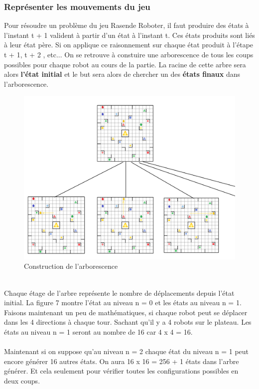 \documentclass{article}
\begin{document}
\subsubsection{Représenter les mouvements du jeu}
Pour résoudre un problème du jeu Rasende Roboter, il faut produire des états à l'instant t + 1 valident à partir d'un état à l'instant t. Ces états produits sont liés à leur état père. Si on applique ce raisonnement sur chaque état produit à l'étape t + 1, t + 2 , etc... On se retrouve à constuire une arborescence de tous les coups possibles pour chaque robot au cours de la partie. La racine de cette arbre sera alors \textbf{l'état initial} et le but sera alors de chercher un des \textbf{états finaux} dans l'arborescence.
\begin{figure}[htbp]
  \centering  
  \includegraphics[width=1\textwidth]{arbre.png}  
  \caption{Construction de l'arborescence} 
  \label{fig:Arborescence}  
\end{figure}\\
Chaque étage de l'arbre représente le nombre de déplacements depuis l'état initial. La figure 7 montre l'état au niveau n = 0 et les états au niveau n = 1. Faisons maintenant un peu de mathématiques, si chaque robot peut se déplacer dans les 4 directions à chaque tour. Sachant qu'il y a 4 robots sur le plateau. Les états au niveau n = 1 seront au nombre de 16 car 4 x 4 = 16.\\\\
Maintenant si on suppose qu'au niveau n = 2 chaque état du niveau n = 1 peut encore générer 16 autres états. On aura 16 x 16 = 256 + 1 états dans l'arbre générer. Et cela seulement pour vérifier toutes les configurations possibles en deux coups.\\\\
\end{document}
